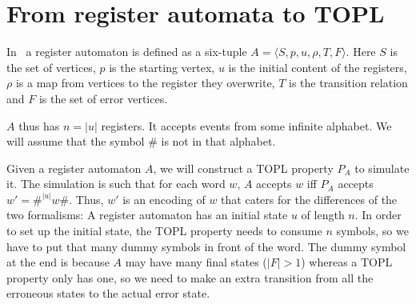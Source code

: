 \section{From register automata to TOPL}
In~\cite{dblp:journals/tcs/kaminskif94} a register automaton is
defined as a six-tuple $A = \langle S, p, u, \rho, T, F\rangle$. Here $S$
is the set of vertices, $p$ is the starting vertex, $u$ is the initial
content of the registers, $\rho$ is a map from vertices to the
register they overwrite, $T$ is the transition relation and $F$ is the
set of error vertices.

$A$ thus has $n = |u|$ registers. It accepts events from some infinite
alphabet. We will assume that the symbol $\#$ is not in that alphabet.

Given a register automaton $A$, we will construct a TOPL property $P_A$ to simulate it. The
simulation is such that for each word $w$, $A$ accepts $w$ iff $P_A$
accepts $w' = \#^{|u|}w\#$. Thus, $w'$ is an encoding of $w$ that
caters for the differences of the two formalisms: A register automaton has an
initial state $u$ of length $n$. In order to set up the initial
state, the TOPL property needs to consume $n$ symbols, so we have to
put that many dummy symbols in front of the word. The dummy symbol at
the end is because $A$ may have many final states ($|F| > 1$) whereas a TOPL
property only has one, so we need to make an extra transition from all
the erroneous states to the actual error state.

